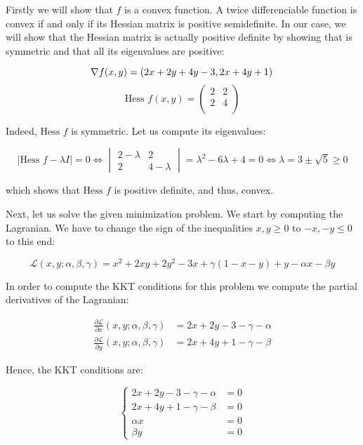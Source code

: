 \documentclass[11pt,table]{article}
\begin{document}
	Firstly we will show that \(f\) is a convex function. A twice differenciable function is convex if and only if its Hessian matrix is positive semidefinite. In our case, we will show that the Hessian matrix is actually positive definite by showing that is symmetric and that all its eigenvalues are positive:
	
	\[
	\nabla f(x,y) = \left( 2x + 2y + 4y -3, 2x +4y +1 \right) \\
	\]
	\[
	\text{Hess } f(x,y) = \begin{pmatrix}
		2 & 2 \\
		2 & 4 \\
	\end{pmatrix}
	\]
	
	Indeed, \(\text{Hess } f\) is symmetric. Let us compute its eigenvalues:
	
	\[
	|\text{Hess }f - \lambda I| = 0 \Longleftrightarrow 
	\begin{vmatrix}
		2 - \lambda & 2 \\
		2 & 4 - \lambda
	\end{vmatrix} = \lambda^2 -6\lambda + 4 = 0 \Longleftrightarrow \lambda = 3 \pm \sqrt 5 \ge 0
	\]
	
	which shows that \(\text{Hess }f\) is positive definite, and thus, convex.
	
	Next, let us solve the given minimization problem. We start by computing the Lagranian. We have to change the sign of the inequalities \(x,y \ge 0\) to \(-x,-y \le 0\) to this end:
	
	\[
	\mathcal L(x,y; \alpha, \beta, \gamma) = x^2 + 2xy + 2y^2 - 3x + \gamma(1 - x - y) + y -\alpha x - \beta y
	\]
	
	In order to compute the KKT conditions for this problem we compute the partial derivatives of the Lagranian:
	
	\begin{align*}
		\frac{\partial \mathcal L}{\partial x}(x,y; \alpha, \beta, \gamma) & = 2x + 2y -3 - \gamma - \alpha \\
		\frac{\partial \mathcal L}{\partial y}(x,y; \alpha, \beta, \gamma) & = 2x + 4y + 1 - \gamma - \beta
	\end{align*}
	
	Hence, the KKT conditions are:
	
	\[
	\begin{cases}
		2x + 2y -3 - \gamma - \alpha & = 0 \\
		2x + 4y + 1 - \gamma - \beta & = 0 \\
		\alpha x & = 0 \\
		\beta y & = 0
	\end{cases}
	\]
	
\end{document}
